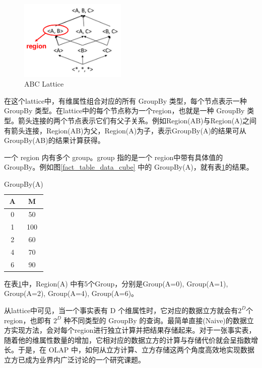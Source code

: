 \begin{figure}[!htb]
\centering\includegraphics[width=2in]{picture/ch_preliminary/abc_lattice} 
\caption{ABC Lattice}\label{abc_lattice} 
\end{figure} 

在这个lattice中，有维属性组合对应的所有 GroupBy 类型，每个节点表示一种 GroupBy 类型。在lattice中的每个节点称为一个region，也就是一种 GroupBy 类型。箭头连接的两个节点表示它们有父子关系。例如Region(AB)与Region(A)之间有箭头连接，Region(AB)为父，Region(A)为子，表示GroupBy(A)的结果可从GroupBy(AB)的结果计算获得。

一个 region 内有多个 group。group 指的是一个
region中带有具体值的 GroupBy。例如图\ref{fact_table_data_cube} 中的 GroupBy(A)，就有表\ref{groupby_a_table}的结果。

\begin{table}[!ht]
\begin{center}
\begin{tabular}{|c|c|}
\hline 
A & M \\ 
\hline 
0 & 50 \\ 
\hline 
1 & 100 \\ 
\hline 
2 & 60 \\ 
\hline 
4 & 70 \\ 
\hline 
6 & 90 \\ 
\hline 
\end{tabular} 
\end{center}
\caption{GroupBy(A)}\label{groupby_a_table}
\end{table}

在表\ref{groupby_a_table}中，Region(A) 中有5个Group，分别是Group(A=0), Group(A=1), Group(A=2), Group(A=4), Group(A=6)。

从lattice中可见，当一个事实表有 D 个维属性时，它对应的数据立方就会有${2}^{D}$个region，也即有 ${2}^{D}$ 种不同类型的 GroupBy 的查询。最简单直接(Naive)的数据立方实现方法，会对每个region进行独立计算并把结果存储起来。对于一张事实表，随着他的维属性数量的增加，它相对应的数据立方的计算与存储代价就会呈指数增长。于是，在 OLAP 中，如何从立方计算、立方存储这两个角度高效地实现数据立方已成为业界内广泛讨论的一个研究课题。


